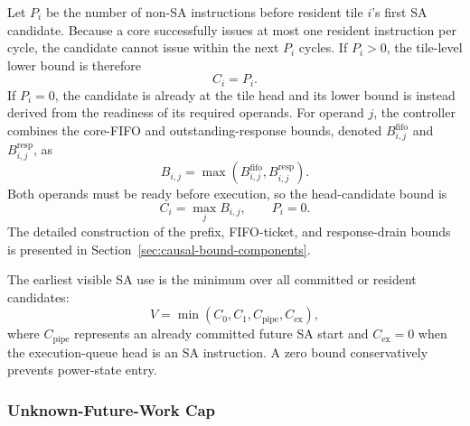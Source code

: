 Let $P_i$ be the number of non-SA instructions before resident tile $i$'s
first SA candidate. Because a core successfully issues at most one resident
instruction per cycle, the candidate cannot issue within the next $P_i$
cycles. If $P_i>0$, the tile-level lower bound is therefore
\begin{equation}
  C_i=P_i.
  \label{eq:prefix-bound-overview}
\end{equation}
If $P_i=0$, the candidate is already at the tile head and its lower bound is
instead derived from the readiness of its required operands. For operand
$j$, the controller combines the core-FIFO and outstanding-response bounds,
denoted $B^{\mathrm{fifo}}_{i,j}$ and
$B^{\mathrm{resp}}_{i,j}$, as
\begin{equation}
  B_{i,j}=\max\!\left(B^{\mathrm{fifo}}_{i,j},
                       B^{\mathrm{resp}}_{i,j}\right).
  \label{eq:operand-combined-bound}
\end{equation}
Both operands must be ready before execution, so the head-candidate bound is
\begin{equation}
  C_i=\max_j B_{i,j}, \qquad P_i=0.
  \label{eq:head-candidate-bound}
\end{equation}
The detailed construction of the prefix, FIFO-ticket, and response-drain
bounds is presented in Section~\ref{sec:causal-bound-components}.

The earliest visible SA use is the minimum over all committed or resident
candidates:
\begin{equation}
  V=\min\!\left(C_0,C_1,C_{\mathrm{pipe}},C_{\mathrm{ex}}\right),
  \label{eq:visible-frontier}
\end{equation}
where $C_{\mathrm{pipe}}$ represents an already committed future SA start and
$C_{\mathrm{ex}}=0$ when the execution-queue head is an SA instruction. A
zero bound conservatively prevents power-state entry.

\subsubsection{Unknown-Future-Work Cap}

